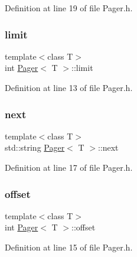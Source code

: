 Definition at line 19 of file Pager.\+h.

\mbox{\label{class_pager_a9f8cb117c3ad77313d043507753138de}} 
\subsubsection{\texorpdfstring{limit}{limit}}
{\footnotesize\ttfamily template$<$class T$>$ \\
int \mbox{\hyperlink{class_pager}{Pager}}$<$ T $>$\+::limit\hspace{0.3cm}{\ttfamily [private]}}



Definition at line 13 of file Pager.\+h.

\mbox{\label{class_pager_aa23a9b59e82bc559213402dff9c49015}} 
\subsubsection{\texorpdfstring{next}{next}}
{\footnotesize\ttfamily template$<$class T$>$ \\
std\+::string \mbox{\hyperlink{class_pager}{Pager}}$<$ T $>$\+::next\hspace{0.3cm}{\ttfamily [private]}}



Definition at line 17 of file Pager.\+h.

\mbox{\label{class_pager_a96252ba885da495cbc14bd10ee9aedf1}} 
\subsubsection{\texorpdfstring{offset}{offset}}
{\footnotesize\ttfamily template$<$class T$>$ \\
int \mbox{\hyperlink{class_pager}{Pager}}$<$ T $>$\+::offset\hspace{0.3cm}{\ttfamily [private]}}



Definition at line 15 of file Pager.\+h.

\mbox{\label{class_pager_ae604dd43254bb9caec42460483aa11ce}} 
